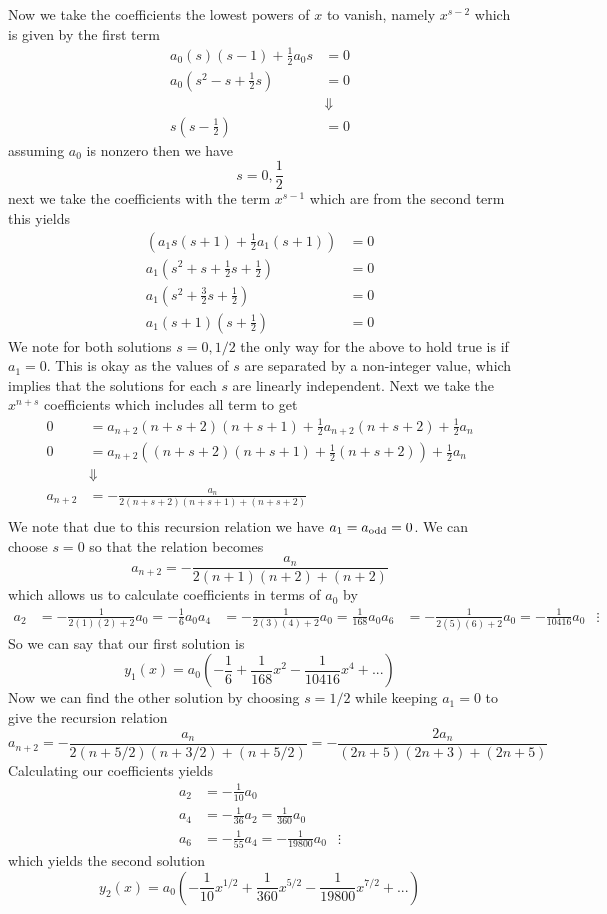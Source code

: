 \documentclass[11pt]{article}
\numberwithin{equation}{section}
\begin{document}
Now we take the coefficients the lowest powers of $x$ to vanish, namely $x^{s-2}$ which is 
given by the first term
\begin{align*}
a_0(s)(s-1) + \frac{1}{2}a_0s &= 0\\
a_0\left(s^2-s + \frac{1}{2}s\right) &= 0\\
&\Downarrow\\
s\left(s-\frac{1}{2}\right) &= 0
\end{align*}
assuming $a_0$ is nonzero then we have 
$$s = 0,\frac{1}{2}$$ 
next we take the coefficients with the term $x^{s-1}$ which are from the second term this 
yields
\begin{align*}
\left(a_1s(s+1)+\frac{1}{2}a_1(s+1)\right) &= 0\\
a_1\left(s^2+s+\frac{1}{2}s+\frac{1}{2}\right) &= 0\\
a_1\left(s^2+\frac{3}{2}s+\frac{1}{2}\right) &= 0\\
a_1(s+1)\left(s+\frac{1}{2}\right) &= 0
\end{align*}
We note for both solutions $s=0,1/2$ the only way for the above to  hold true is if $a_1=0$. 
This is okay as the values of $s$ are separated by a non-integer value, which implies that 
the solutions for each $s$ are linearly independent. Next we take the $x^{n+s}$ coefficients
which includes all term to get
\begin{align*}
0 &= a_{n+2}(n+s+2)(n+s+1) + \frac{1}{2}a_{n+2}(n+s+2) + \frac{1}{2}a_n\\
0 &= a_{n+2}\left((n+s+2)(n+s+1) + \frac{1}{2}(n+s+2)\right) + \frac{1}{2}a_n\\
&\Downarrow\\
a_{n+2} &= -\frac{a_n}{2(n+s+2)(n+s+1) + (n+s+2)}\\
\end{align*}
We note that due to this recursion relation we have $a_1=a_{\textnormal{odd}}=0$. We can 
choose $s=0$ so that the relation becomes 
$$a_{n+2} = -\frac{a_n}{2(n+1)(n+2)+(n+2)}$$
which allows us to calculate coefficients in terms of $a_0$ by
\begin{align*}
a_2 &= -\frac{1}{2(1)(2)+2}a_0 = -\frac{1}{6}a_0
a_4 &= -\frac{1}{2(3)(4)+2}a_0 = \frac{1}{168}a_0
a_6 &= -\frac{1}{2(5)(6)+2}a_0 = -\frac{1}{10416}a_0
&\vdots
\end{align*}
So we can say that our first solution is 
$$y_1(x) = a_0\left(-\frac{1}{6} + \frac{1}{168}x^2 - \frac{1}{10416}x^4+...\right)$$
Now we can find the other solution by choosing $s=1/2$ while keeping $a_1=0$ to give the 
recursion relation 
$$a_{n+2} =  -\frac{a_n}{2(n+5/2)(n+3/2)+(n+5/2)} = -\frac{2a_n}{(2n+5)(2n+3)+(2n+5)}$$
Calculating our coefficients yields
\begin{align*}
a_2 &= -\frac{1}{10}a_0\\
a_4 &= -\frac{1}{36}a_2 = \frac{1}{360}a_0\\
a_6 &= -\frac{1}{55}a_4 = -\frac{1}{19800}a_0
&\vdots
\end{align*}
which yields the second solution
$$y_2(x) = a_0\left(-\frac{1}{10}x^{1/2} + \frac{1}{360}x^{5/2} - \frac{1}{19800}x^{7/2}+...\right)$$
\end{document}
